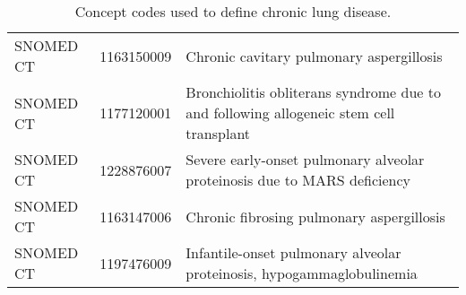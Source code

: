 \begin{table}[ht]
\begin{tabular}{lll}
  SNOMED CT & 1163150009 & Chronic cavitary pulmonary aspergillosis \\ 
  SNOMED CT & 1177120001 & Bronchiolitis obliterans syndrome due to and following allogeneic stem cell transplant \\ 
  SNOMED CT & 1228876007 & Severe early-onset pulmonary alveolar proteinosis due to MARS deficiency \\ 
  SNOMED CT & 1163147006 & Chronic fibrosing pulmonary aspergillosis \\ 
  SNOMED CT & 1197476009 & Infantile-onset pulmonary alveolar proteinosis, hypogammaglobulinemia \\ 
   \hline
\end{tabular}
\caption{Concept codes used to define chronic lung disease.} 
\label{tab:codes_lung_disease}
\end{table}
